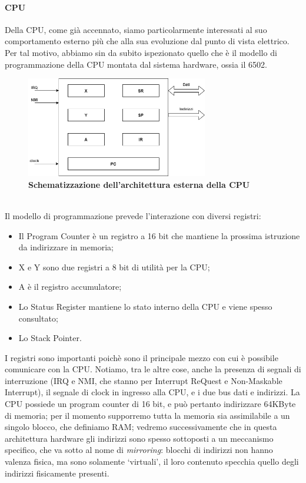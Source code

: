 \documentclass[11pt]{article}
\begin{document}
\paragraph{CPU}
Della CPU, come già accennato, siamo particolarmente interessati al suo comportamento esterno più che alla sua evoluzione dal punto di vista elettrico. Per tal motivo, abbiamo sin da subito ispezionato quello che è il modello di programmazione della CPU montata dal sistema hardware, ossia il 6502. 
\begin{figure}[h]
\centering
\includegraphics[width=300px, height=166px]{CPU.png}
\small\textbf{Schematizzazione dell'architettura esterna della CPU}
\end{figure}\\
Il modello di programmazione prevede l'interazione con diversi registri:
\begin{itemize}
	\item{
		Il Program Counter è un registro a 16 bit che mantiene la prossima istruzione da indirizzare in memoria;
	}
	\item{
		X e Y sono due registri a 8 bit di utilità per la CPU;	
	}
	\item{
		A è il registro accumulatore;
	}
	\item{
		Lo Status Register mantiene lo stato interno della CPU e viene spesso consultato;
	}
	\item{
		Lo Stack Pointer.
	}
\end{itemize}
I registri sono importanti poichè sono il principale mezzo con cui è possibile comunicare con la CPU. Notiamo, tra le altre cose, anche la presenza di segnali di interruzione (IRQ e NMI, che stanno per Interrupt ReQuest e Non-Maskable Interrupt), il segnale di clock in ingresso alla CPU, e i due bus dati e indirizzi. La CPU possiede un program counter di 16 bit, e può pertanto indirizzare 64KByte di memoria; per il momento supporremo tutta la memoria sia assimilabile a un singolo blocco, che definiamo RAM; vedremo successivamente che in questa architettura hardware gli indirizzi sono spesso sottoposti a un meccanismo specifico, che va sotto al nome di \emph{mirroring}: blocchi di indirizzi non hanno valenza fisica, ma sono solamente `virtuali', il loro contenuto specchia quello degli indirizzi fisicamente presenti. 
\end{document}
